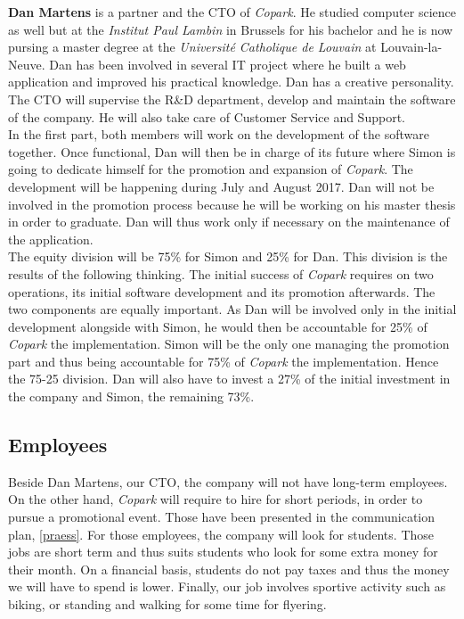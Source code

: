 \documentclass[12pt,a4paper,oneside]{book}
\newcommand{\bp}{\textit{Copark}}
\begin{document}
\textbf{Dan Martens} is a partner and the CTO of \bp{}. He studied computer science as well but at the \textit{Institut Paul Lambin} in Brussels for his bachelor and he is now pursing a master degree at the \textit{Université Catholique de Louvain} at Louvain-la-Neuve. Dan has been involved in several IT project where he built a web application and improved his practical knowledge. Dan has a creative personality. The CTO will supervise the R\&D department, develop and maintain the software of the company. He will also take care of Customer Service and Support.\\

In the first part, both members will work on the development of the software together. Once functional, Dan will then be in charge of its future where Simon is going to dedicate himself for the promotion and expansion of \bp{}. The development will be happening during July and August 2017. Dan will not be involved in the promotion process because he will be working on his master thesis in order to graduate. Dan will thus work only if necessary on the maintenance of the application.\\

The equity division will be 75\% for Simon and 25\% for Dan. This division is the results of the following thinking. The initial success of \bp{} requires on two operations, its initial software development and its promotion afterwards. The two components are equally important. As Dan will be involved only in the initial development alongside with Simon, he would then be accountable for 25\% of \bp{} the implementation. Simon will be the only one managing the promotion part and thus being accountable for 75\% of \bp{} the implementation. Hence the 75-25 division. Dan will also have to invest a 27\% of the initial investment in the company and Simon, the remaining 73\%.

\subsection{Employees}

Beside Dan Martens, our CTO, the company will not have long-term employees. On the other hand, \bp{} will require to hire for short periods, in order to pursue a promotional event. Those have been presented in the communication plan, \autoref{praess}. For those employees, the company will look for students. Those jobs are short term and thus suits students who look for some extra money for their month. On a financial basis, students do not pay taxes and thus the money we will have to spend is lower. Finally, our job involves sportive activity such as biking, or standing and walking for some time for flyering.
\end{document}
